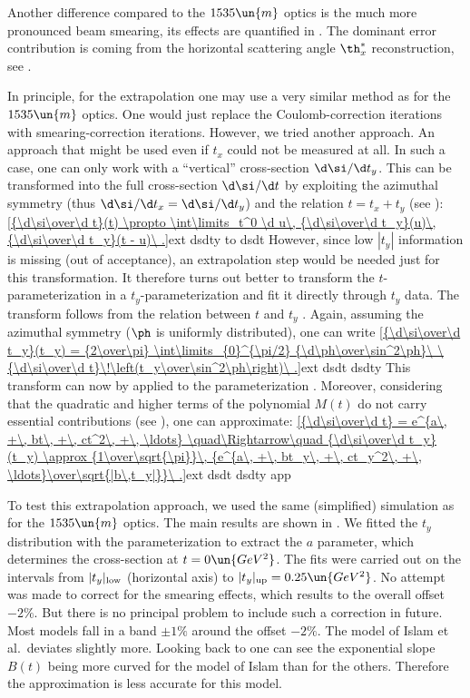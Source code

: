 Another difference compared to the $1535\un{m}$ optics is the much more pronounced beam smearing, its effects are quantified in . The dominant error contribution is coming from the horizontal scattering angle $\th_x^*$ reconstruction, see .

In principle, for the extrapolation one may use a very similar method as for the $1535\un{m}$ optics. One would just replace the Coulomb-correction iterations with smearing-correction iterations. However, we tried another approach. An approach that might be used even if $t_x$ could not be measured at all. In such a case, one can only work with a ``vertical'' cross-section $\d\si/\d t_y$. This can be transformed into the full cross-section $\d\si/\d t$ by exploiting the azimuthal symmetry (thus $\d\si/\d t_x = \d\si/\d t_y$) and the relation $t = t_x + t_y$ (see ):
\eqref{{\d\si\over\d t}(t) \propto \int\limits_t^0 \d u\, {\d\si\over\d t_y}(u)\, {\d\si\over\d t_y}(t - u)\ .}{ext dsdty to dsdt}
However, since low $|t_y|$ information is missing (out of acceptance), an extrapolation step would be needed just for this transformation. It therefore turns out better to transform the $t$-parameterization  in a $t_y$-parameterization and fit it directly through $t_y$ data. The transform follows from the relation between $t$ and $t_y$ . Again, assuming the azimuthal symmetry ($\ph$ is uniformly distributed), one can write
\eqref{{\d\si\over\d t_y}(t_y) = {2\over\pi} \int\limits_{0}^{\pi/2} {\d\ph\over\sin^2\ph}\ \ {\d\si\over\d t}\!\left(t_y\over\sin^2\ph\right)\ .}{ext dsdt dsdty}
This transform can now by applied to the parameterization . Moreover, considering that the quadratic and higher terms of the polynomial $M(t)$ do not carry essential contributions (see ), one can approximate:
\eqref{{\d\si\over\d t} = e^{a\, +\, bt\, +\, ct^2\, +\, \ldots} \quad\Rightarrow\quad {\d\si\over\d t_y}(t_y) \approx {1\over\sqrt{\pi}}\, {e^{a\, +\, bt_y\, +\, ct_y^2\, +\, \ldots}\over\sqrt{|b\,t_y|}}\ .}{ext dsdt dsdty app}

To test this extrapolation approach, we used the same (simplified)  simulation as for the $1535\un{m}$ optics. The main results are shown in . We fitted the $t_y$ distribution with the parameterization  to extract the $a$ parameter, which determines the cross-section at $t=0\un{GeV^2}$. The fits were carried out on the intervals from $|t_y|_{\rm low}$ (horizontal axis) to $|t_y|_{\rm up} = 0.25\un{GeV^2}$. No attempt was made to correct for the smearing effects, which results to the overall offset $-2\percent$. But there is no principal problem to include such a correction in future. Most models fall in a band $\pm 1\percent$ around the offset $-2\percent$. The model of Islam et al.~deviates slightly more. Looking back to  one can see the exponential slope $B(t)$ being more curved for the model of Islam than for the others. Therefore the approximation  is less accurate for this model.

